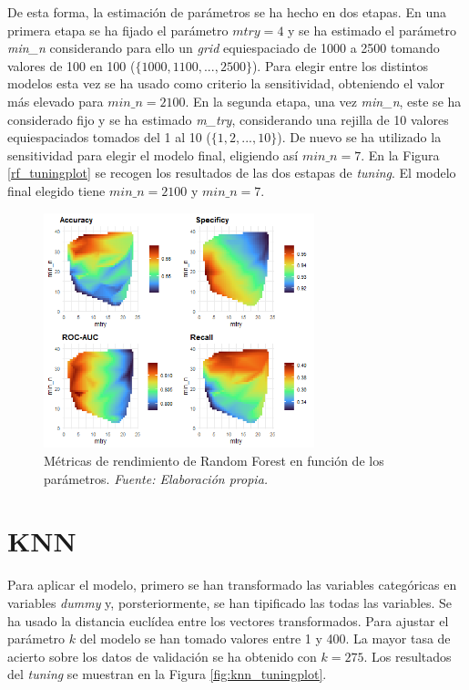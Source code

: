 \documentclass[12pt,a4paper,]{book}
\newcounter{dummy}
\numberwithin{dummy}{section}
\theoremstyle{ocrenumbox}
\theoremstyle{blacknumex}
\theoremstyle{blacknumbox}
\theoremstyle{ocrenum}
\theoremstyle{ocrenum}
\begin{document}
De esta forma, la estimación de parámetros se ha hecho en dos etapas. En
una primera etapa se ha fijado el parámetro \(mtry = 4\) y se ha
estimado el parámetro \emph{min\_n} considerando para ello un
\emph{grid} equiespaciado de 1000 a 2500 tomando valores de 100 en 100
(\(\{1000,1100,...,2500\}\)). Para elegir entre los distintos modelos
esta vez se ha usado como criterio la sensitividad, obteniendo el valor
más elevado para \(min\_n = 2100\). En la segunda etapa, una vez
\emph{min\_n}, este se ha considerado fijo y se ha estimado
\emph{m\_try}, considerando una rejilla de 10 valores equiespaciados
tomados del 1 al 10 (\(\{1,2,...,10\}\)). De nuevo se ha utilizado la
sensitividad para elegir el modelo final, eligiendo así \(min\_n = 7\).
En la Figura \ref{rf_tuningplot} se recogen los resultados de las dos
estapas de \emph{tuning}. El modelo final elegido tiene
\(min\_n = 2100\) y \(min\_n = 7\).

\begin{figure}[h!]
\centering
\includegraphics[width =0.7\textwidth]{graficos/rf_tuningplot.png}
\caption[Métricas de rendimiento de Random Forest en función de los parámetros]{Métricas de rendimiento de Random Forest en función de los parámetros.  \it Fuente: Elaboración propia.}
\label{fig:rf_tuningplot}
\end{figure}

\hypertarget{knn}{%
\section{KNN}\label{knn}}

Para aplicar el modelo, primero se han transformado las variables
categóricas en variables \emph{dummy} y, porsteriormente, se han
tipificado las todas las variables. Se ha usado la distancia euclídea
entre los vectores transformados. Para ajustar el parámetro \(k\) del
modelo se han tomado valores entre 1 y 400. La mayor tasa de acierto
sobre los datos de validación se ha obtenido con \(k = 275\). Los
resultados del \emph{tuning} se muestran en la Figura
\ref{fig:knn_tuningplot}.
\end{document}
